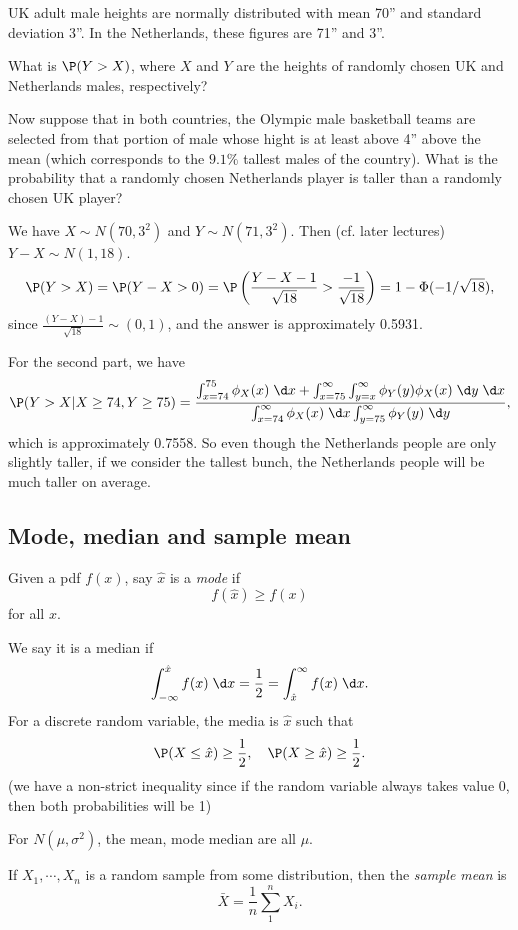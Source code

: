 \documentclass[a4paper]{article}
\begin{document}
\begin{eg}
  UK adult male heights are normally distributed with mean 70'' and standard deviation 3''. In the Netherlands, these figures are 71'' and 3''.

  What is $\P(Y > X)$, where $X$ and $Y$ are the heights of randomly chosen UK and Netherlands males, respectively?

  Now suppose that in both countries, the Olympic male basketball teams are selected from that portion of male whose hight is at least above 4'' above the mean (which corresponds to the $9.1\%$ tallest males of the country). What is the probability that a randomly chosen Netherlands player is taller than a randomly chosen UK player?

  We have $X\sim N(70, 3^2)$ and $Y\sim N(71, 3^2)$. Then (cf. later lectures) $Y - X \sim N(1, 18)$.
  \[
    \P(Y > X) = \P(Y - X > 0) = \P\left(\frac{Y - X - 1}{\sqrt{18}} > \frac{-1}{\sqrt{18}}\right) = 1 - \Phi(-1/\sqrt{18}),
  \]
  since $\frac{(Y - X) - 1}{\sqrt{18}}\sim (0, 1)$, and the answer is approximately 0.5931.

  For the second part, we have
  \[
    \P(Y > X|X \geq 74, Y \geq 75) = \frac{\int_{x = 74}^{75} \phi_X(x)\;\d x + \int_{x = 75}^\infty \int_{y=x}^\infty \phi_Y(y)\phi_X(x)\;\d y\;\d x}{\int_{x=74}^\infty \phi_X(x)\;\d x \int_{y=75}^\infty \phi_Y(y)\;\d y},
  \]
  which is approximately 0.7558. So even though the Netherlands people are only slightly taller, if we consider the tallest bunch, the Netherlands people will be much taller on average.
\end{eg}

\subsection{Mode, median and sample mean}
\begin{defi}
  Given a pdf $f(x)$, say $\hat x$ is a \emph{mode} if
  \[
    f(\hat x) \geq f(x)
  \]
  for all $x$.

  We say it is a median if
  \[
    \int_{-\infty}^{\hat x}f(x)\;\d x = \frac{1}{2} = \int_{\hat x}^\infty f(x)\;\d x.
  \]
  For a discrete random variable, the media is $\hat x$ such that
  \[
    \P(X \leq \hat x) \geq \frac{1}{2}, \quad \P(X \geq \hat x) \geq \frac{1}{2}.
  \]
  (we have a non-strict inequality since if the random variable always takes value $0$, then both probabilities will be 1)
\end{defi}

For $N(\mu, \sigma^2)$, the mean, mode median are all $\mu$. 
\begin{defi}
  If $X_1, \cdots, X_n$ is a random sample from some distribution, then the \emph{sample mean} is
  \[
    \bar X = \frac{1}{n}\sum_1^n X_i.
  \]
\end{defi}
\end{document}
